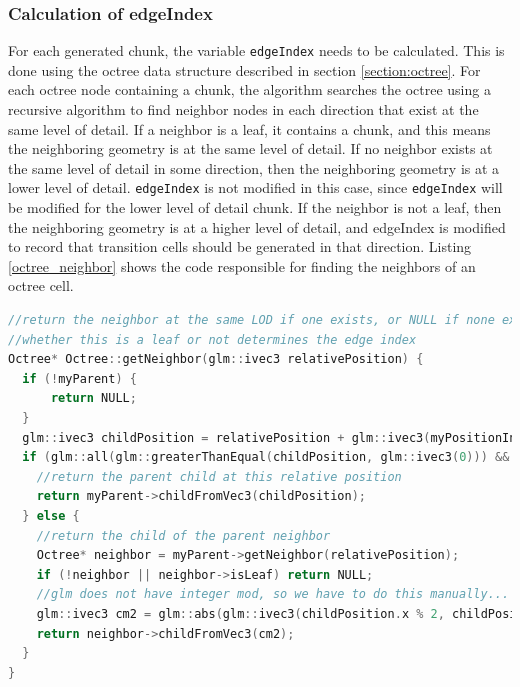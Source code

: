 \documentclass{article}
\begin{document}
\subsubsection{Calculation of edgeIndex}
\label{section:edgeIndex}
For each generated chunk, the variable \texttt{edgeIndex} needs to be calculated. This is done using the octree data structure described in section \ref{section:octree}. For each octree node containing a chunk, the algorithm searches the octree using a recursive algorithm to find neighbor nodes in each direction that exist at the same level of detail. If a neighbor is a leaf, it contains a chunk, and this means the neighboring geometry is at the same level of detail. If no neighbor exists at the same level of detail in some direction, then the neighboring geometry is at a lower level of detail. \texttt{edgeIndex} is not modified in this case, since \texttt{edgeIndex} will be modified for the lower level of detail chunk. If the neighbor is not a leaf, then the neighboring geometry is at a higher level of detail, and edgeIndex is modified to record that transition cells should be generated in that direction. Listing \ref{octree_neighbor} shows the code responsible for finding the neighbors of an octree cell.

\begin{lstlisting}[language=C++,label={octree_neighbor},caption={Code for finding the neighbor of a cell at the same level of detail in an octree. The children of an octree node are stored as a 3D array of pointers to octree objects: \texttt{Octree* myChildren[2][2][2];}. \texttt{relativePosition} is a 3-component vector, where exactly one component is non-zero, corresponding to the direction in which to look for the neighbor. For example, a value of $\left(1,0,0\right)$ searches in the positive X direction, and a value of $\left(0,0,-1\right)$ searches in the negative Z direction.}]
//return the neighbor at the same LOD if one exists, or NULL if none exists
//whether this is a leaf or not determines the edge index
Octree* Octree::getNeighbor(glm::ivec3 relativePosition) {
  if (!myParent) {
      return NULL;
  }
  glm::ivec3 childPosition = relativePosition + glm::ivec3(myPositionInParent);
  if (glm::all(glm::greaterThanEqual(childPosition, glm::ivec3(0))) && glm::all(glm::lessThanEqual(childPosition,glm::ivec3(1)))) {
    //return the parent child at this relative position
    return myParent->childFromVec3(childPosition);
  } else {
    //return the child of the parent neighbor
    Octree* neighbor = myParent->getNeighbor(relativePosition);
    if (!neighbor || neighbor->isLeaf) return NULL;
    //glm does not have integer mod, so we have to do this manually...
    glm::ivec3 cm2 = glm::abs(glm::ivec3(childPosition.x % 2, childPosition.y % 2, childPosition.z % 2));
    return neighbor->childFromVec3(cm2);
  }
}
\end{lstlisting}
\end{document}
